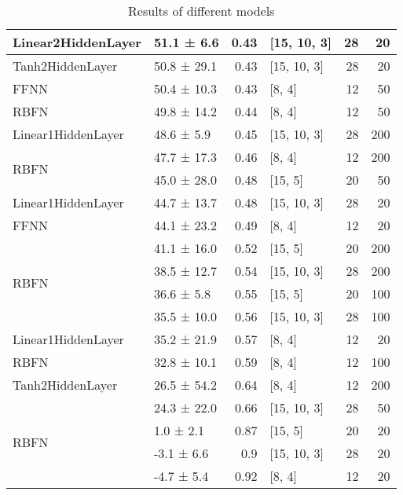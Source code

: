 \begin{table*}[h]
\begin{tabular}{llrlrr}
 \hline
Linear2HiddenLayer                  & 51.1 ± 6.6  &  0.43 & [15, 10, 3]    &         28 &       20 \\
 \hline
Tanh2HiddenLayer                    & 50.8 ± 29.1 &  0.43 & [15, 10, 3]    &         28 &       20 \\
 \hline
FFNN                                & 50.4 ± 10.3 &  0.43 & [8, 4]         &         12 &       50 \\
 \hline
RBFN                                & 49.8 ± 14.2 &  0.44 & [8, 4]         &         12 &       50 \\
 \hline
Linear1HiddenLayer                  & 48.6 ± 5.9  &  0.45 & [15, 10, 3]    &         28 &      200 \\
 \hline
\multirow{2}{*}{RBFN}               & 47.7 ± 17.3 &  0.46 & [8, 4]         &         12 &      200 \\
                                            & 45.0 ± 28.0 &  0.48 & [15, 5]        &         20 &       50 \\
 \hline
Linear1HiddenLayer                  & 44.7 ± 13.7 &  0.48 & [15, 10, 3]    &         28 &       20 \\
 \hline
FFNN                                & 44.1 ± 23.2 &  0.49 & [8, 4]         &         12 &       20 \\
 \hline
\multirow{4}{*}{RBFN}               & 41.1 ± 16.0 &  0.52 & [15, 5]        &         20 &      200 \\
                                            & 38.5 ± 12.7 &  0.54 & [15, 10, 3]    &         28 &      200 \\
                                            & 36.6 ± 5.8  &  0.55 & [15, 5]        &         20 &      100 \\
                                            & 35.5 ± 10.0 &  0.56 & [15, 10, 3]    &         28 &      100 \\
 \hline
Linear1HiddenLayer                  & 35.2 ± 21.9 &  0.57 & [8, 4]         &         12 &       20 \\
 \hline
RBFN                                & 32.8 ± 10.1 &  0.59 & [8, 4]         &         12 &      100 \\
 \hline
Tanh2HiddenLayer                    & 26.5 ± 54.2 &  0.64 & [8, 4]         &         12 &      200 \\
 \hline
\multirow{4}{*}{RBFN}               & 24.3 ± 22.0 &  0.66 & [15, 10, 3]    &         28 &       50 \\
                                            & 1.0 ± 2.1   &  0.87 & [15, 5]        &         20 &       20 \\
                                            & -3.1 ± 6.6  &  0.9  & [15, 10, 3]    &         28 &       20 \\
                                            & -4.7 ± 5.4  &  0.92 & [8, 4]         &         12 &       20 \\
\hline
\end{tabular}
        \caption{Results of different models}
        \label{models}
    \end{table*}
    
